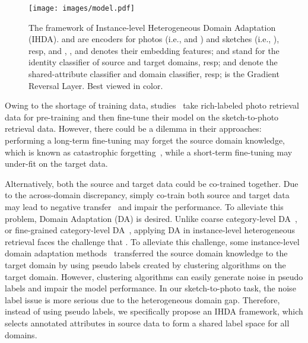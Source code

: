\documentclass[journal]{IEEEtran}
\begin{document}
\begin{figure*}[!htb]
    \centering
    \texttt{[image: images/model.pdf]}
 \caption{The framework of Instance-level Heterogeneous Domain Adaptation (IHDA).  and  are encoders for photos (i.e.,  and ) and sketches (i.e., ), resp, and , , and  denotes their embedding features;  and  stand for the identity classifier of source and target domains, resp;  and  denote the shared-attribute classifier and domain classifier, resp;  is the Gradient Reversal Layer. Best viewed in color.}
  \label{fig:model}
\end{figure*}

Owing to the shortage of training data, studies~\cite{song2017deep,wu2018light,wu2018coupled,deng2019residual,yu2016sketch,song2016deep} take rich-labeled photo retrieval data for pre-training and then fine-tune their model on the sketch-to-photo retrieval data. However, there could be a dilemma in their approaches: performing a long-term fine-tuning may forget the source domain knowledge, which is known as catastrophic forgetting~\cite{lopez2017gradient,aljundi2018memory}, while a short-term fine-tuning may under-fit on the target data.

Alternatively, both the source and target data could be co-trained together. Due to the across-domain discrepancy, simply co-train both source and target data may lead to negative transfer~\cite{pan2010survey} and impair the performance. To alleviate this problem, Domain Adaptation (DA) is desired. Unlike coarse category-level DA~\cite{pei2018multi,rozantsev2018beyond,cao2018partial,zou2019consensus}, or fine-grained category-level DA~\cite{gebru2017fine,cui2018large}, applying DA in instance-level heterogeneous retrieval faces the challenge that . To alleviate this challenge, some instance-level domain adaptation methods~\cite{ge2020mutual,song2020unsupervised} transferred the source domain knowledge to the target domain by using pseudo labels created by clustering algorithms on the target domain. However, clustering algorithms can easily generate noise in pseudo labels and impair the model performance. In our sketch-to-photo task, the noise label issue is more serious due to the heterogeneous domain gap. Therefore, instead of using pseudo labels, we specifically propose an IHDA framework, which selects annotated attributes in source data to form a shared label space for all domains.
\end{document}
